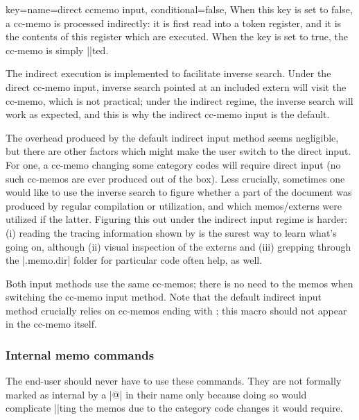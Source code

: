 \documentclass[a4paper,11pt]{article}
\begin{document}
\begin{doc}{
    key={name=direct ccmemo input, conditional=false},
  }
  When this key is set to false, a cc-memo is processed indirectly: it is first
  read into a token register, and it is the contents of this register which are
  executed.  When the key is set to true, the cc-memo is simply ||ted.
  
  The indirect execution is implemented to facilitate inverse search.  Under
  the direct cc-memo input, inverse search pointed at an included extern will
  visit the cc-memo, which is not practical; under the indirect regime, the
  inverse search will work as expected, and this is why the indirect cc-memo
  input is the default.

  The overhead produced by the default indirect input method seems negligible,
  but there are other factors which might make the user switch to the direct
  input.  For one, a cc-memo changing some category codes will require direct
  input (no such cc-memos are ever produced out of the box).  Less crucially,
  sometimes one would like to use the inverse search to figure whether a part
  of the document was produced by regular compilation or utilization, and which
  memos\slash externs were utilized if the latter.  Figuring this out under the
  indirect input regime is harder: (i) reading the tracing information shown by
   is the surest way to learn what's going on, although (ii)
  visual inspection of the externs and (iii) grepping through the |.memo.dir|
  folder for particular code often help, as well.

  Both input methods use the same cc-memos; there is no need to
   the memos when switching the cc-memo input method.  Note
  that the default indirect input method crucially relies on cc-memos ending
  with ; this macro should not appear in the cc-memo itself.
\end{doc}



\subsubsection{Internal memo commands}
\label{sec:ref:memoization:internal}

The end-user should never have to use these commands.  They are not formally
marked as internal by a |@| in their name only because doing so would
complicate ||ting the memos due to the category code changes it would
require.
\end{document}
